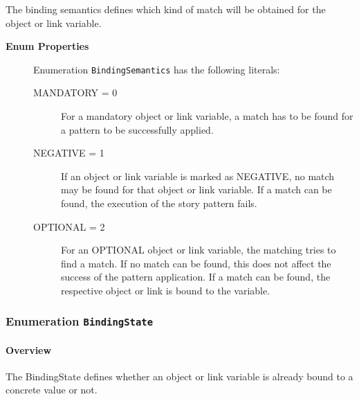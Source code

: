 			
The binding semantics defines which kind of match will be obtained for the object or link variable.	
		
	


\begin{description}

	\item[\textbf{Enum Properties}] Enumeration \texttt{BindingSemantics} has the following literals:

	\begin{description}
		
		\item[MANDATORY = 0]
		\hspace{\fill}
		\nopagebreak
		
For a mandatory object or link variable, a match has to be found for a pattern to be successfully applied.	

		\item[NEGATIVE = 1]
		\hspace{\fill}
		\nopagebreak
		
If an object or link variable is marked as NEGATIVE, no match may be found for that object or link variable. If a match can be found, the execution of the story pattern fails.	

		\item[OPTIONAL = 2]
		\hspace{\fill}
		\nopagebreak
		
For an OPTIONAL object or link variable, the matching tries to find a match. If no match can be found, this does not affect the success of the pattern application. If a match can be found, the respective object or link is bound to the variable.	
 
	\end{description}

\end{description}



\subsubsection{\Large{Enumeration \bfseries \texttt{BindingState}\normalfont}}
\label{cls:modeling::patterns::BindingState} 
\paragraph{Overview}
	
			
The BindingState defines whether an object or link variable is already bound to a concrete value or not.	
		
